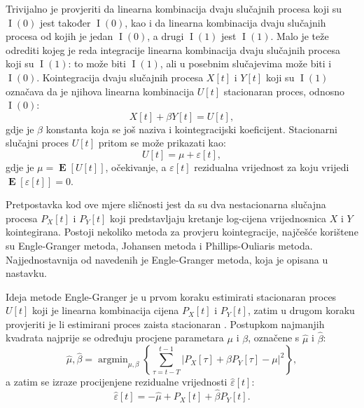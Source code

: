 \documentclass[lmodern, utf8, diplomski, numeric]{fer}
\newcommand{\E}[1]{\operatorname{\mathbf{E}}\q[#1\w]}
\newcommand{\I}[1]{\operatorname{\mathrm{I}}\q(#1\w)}
\newcommand{\q}{\left}
\newcommand{\w}{\right}
\DeclareMathOperator*{\argmin}{arg\min}
\begin{document}
  Trivijalno je provjeriti da linearna kombinacija dvaju slučajnih procesa koji su $\I{0}$ jest također $\I{0}$, kao i da linearna kombinacija dvaju slučajnih procesa od kojih je jedan $\I{0}$, a drugi $\I{1}$ jest $\I{1}$.
  Malo je teže odrediti kojeg je reda integracije linearna kombinacija dvaju slučajnih procesa koji su $\I{1}$: to može biti $\I{1}$, ali u posebnim slučajevima može biti i $\I{0}$.
  Kointegracija dvaju slučajnih procesa $X\q[t\w]$ i $Y\q[t\w]$ koji su $\I{1}$ označava da je njihova linearna kombinacija $U\q[t\w]$ stacionaran proces, odnosno $\I{0}$:
  \begin{equation}
  X\q[t\w] + \beta Y\q[t\w] = U\q[t\w],
  \end{equation}
  gdje je $\beta$ konstanta koja se još naziva i kointegracijski koeficijent.
  Stacionarni slučajni proces $U\q[t\w]$ pritom se može prikazati kao:
  \begin{equation}
  U\q[t\w] = \mu + \varepsilon\q[t\w],
  \end{equation}
  gdje je $\mu = \E{U\q[t\w]}$, očekivanje, a $\varepsilon\q[t\w]$ rezidualna vrijednost za koju vrijedi $\E{\varepsilon\q[t\w]} = 0$.
  
  Pretpostavka kod ove mjere sličnosti jest da su dva nestacionarna slučajna procesa $P_X\q[t\w]$ i $P_Y\q[t\w]$ koji predstavljaju kretanje log-cijena vrijednosnica $X$ i $Y$ kointegirana.
  Postoji nekoliko metoda za provjeru kointegracije, najčešće korištene su Engle-Granger metoda, Johansen metoda i Phillips-Ouliaris metoda.
  Najjednostavnija od navedenih je Engle-Granger metoda, koja je opisana u nastavku.
  
  Ideja metode Engle-Granger je u prvom koraku estimirati stacionaran proces $U\q[t\w]$ koji je linearna kombinacija cijena $P_X\q[t\w]$ i $P_Y\q[t\w]$, zatim u drugom koraku provjeriti je li estimirani proces zaista stacionaran \citep{engle-granger}.
  Postupkom najmanjih kvadrata najprije se određuju procjene parametara $\mu$ i $\beta$, označene s $\hat{\mu}$ i $\hat{\beta}$:
  \begin{equation}
  \hat{\mu}, \hat{\beta} = \argmin_{\mu, \beta} \q\{\sum_{\tau = t - T}^{t - 1} \q \lvert P_X\q[\tau\w] + \beta P_Y\q[\tau\w] -\mu \w \rvert^2\w\},
  \end{equation}
  a zatim se izraze procijenjene rezidualne vrijednosti $\hat{\varepsilon}\q[t\w]$:
  \begin{equation}
  \hat{\varepsilon}\q[t\w] = -\hat{\mu} + P_X\q[t\w] + \hat{\beta} P_Y\q[t\w].
  \end{equation}
  
\end{document}
